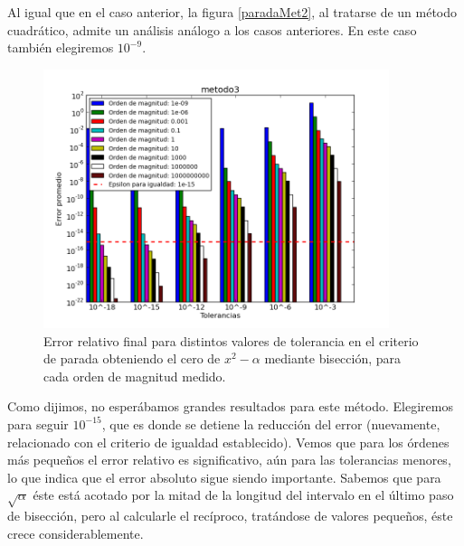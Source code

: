 Al igual que en el caso anterior, la figura \ref{paradaMet2}, al tratarse de un método cuadrático, admite un análisis análogo a los casos anteriores. En este caso también elegiremos $10^{-9}$.

\begin{figure}[H]
  \centering
    \includegraphics[width=0.9\textwidth]{../data/metodo3.png}
    \caption{Error relativo final para distintos valores de tolerancia en el criterio de parada obteniendo el cero de $x^2 - \alpha$ mediante bisección, para cada orden de magnitud medido.}
    \label{paradaMet3}
\end{figure}

Como dijimos, no esperábamos grandes resultados para este método. Elegiremos para seguir $10^{-15}$, que es donde se detiene la reducción del error (nuevamente, relacionado con el criterio de igualdad establecido). Vemos que para los órdenes más pequeños el error relativo es significativo, aún para las tolerancias menores, lo que indica que el error absoluto sigue siendo importante. Sabemos que para $\sqrt{\alpha}$ éste está acotado por la mitad de la longitud del intervalo en el último paso de bisección, pero al calcularle el recíproco, tratándose de valores pequeños, éste crece considerablemente.



